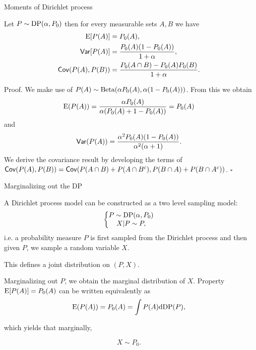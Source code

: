 \begin{frame}[allowframebreaks]{Moments of Dirichlet process}
	\begin{proposition}
Let $P\sim \text{DP}(\alpha, P_0)$ then for every measurable sets $A, B$ we have
\begin{align*}
    \mathrm{E}[ P(A)] &= P_0(A),\\
    \mathsf{Var}[P(A)] &= \frac{P_0(A)(1-P_0(A))}{1+\alpha},\\
    \mathsf{Cov}( P(A), P(B) )&=\frac{P_0(A \cap B) - P_0(A)P_0(B) }{1+\alpha}\label{Dir:Covariance}.
\end{align*}
\end{proposition}
\framebreak

\alert{Proof.}
We make use of  $P(A)\sim \text{Beta}(\alpha P_0(A), \alpha (1-P_0(A)))$. From this we obtain 
\begin{equation*}
    \mathrm{E} (P(A)) = \frac{\alpha P_0(A)}{\alpha( P_0(A) + 1 - P_0(A) )} = P_0(A)
\end{equation*}
and 
\begin{equation*}
    \mathsf{Var}(P(A))=\frac{\alpha^2 P_0(A)( 1-P_0(A) )}{\alpha^2 (\alpha + 1)}.
\end{equation*}
We derive the covariance result by developing the terms of $\mathsf{Cov} (P(A), P(B)) = \mathsf{Cov} (P(A\cap B) +P(A\cap B^c), P(B\cap A) + P(B\cap A^c) )$.
\hfill $\square$
\end{frame}


\begin{frame}{Marginalizing out the DP}

A Dirichlet process model can be constructed as a two level sampling model:
\begin{equation*}
    \left \{ \begin{matrix}
P \sim \text{DP}(\alpha, P_0)\\ 
X|P \sim P,
\end{matrix}\right.
\end{equation*}
i.e. a probability measure $P$ is first sampled from the Dirichlet process and then given  $P$, we sample a random variable $X$. 

This defines a \alert{joint} distribution on $(P,X)$. 

\pause

\textcolor{red2}{Marginalizing out $P$}, we obtain the marginal distribution of $X$. Property $\mathrm{E}[ P(A)] = P_0(A)$ can be written equivalently as
\begin{equation*}
    \mathrm{E}( P(A)) = P_0(A) = \int P(A)\mathrm{d} \text{DP}(P),
\end{equation*}

which yields that marginally,

$$X\sim P_0.$$

\end{frame}


